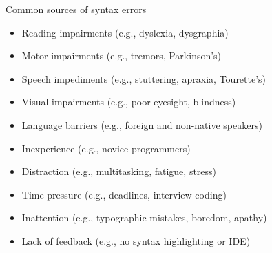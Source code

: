 \documentclass{beamer}
\begin{document}
\begin{frame}[fragile]{Common sources of syntax errors}
  \begin{itemize}
    \item Reading impairments (e.g., dyslexia, dysgraphia)
    \item Motor impairments (e.g., tremors, Parkinson's)
    \item Speech impediments (e.g., stuttering, apraxia, Tourette's)
    \item Visual impairments (e.g., poor eyesight, blindness)
    \item Language barriers (e.g., foreign and non-native speakers)
    \item Inexperience (e.g., novice programmers)
    \item Distraction (e.g., multitasking, fatigue, stress)
    \item Time pressure (e.g., deadlines, interview coding)
    \item Inattention (e.g., typographic mistakes, boredom, apathy)
    \item Lack of feedback (e.g., no syntax highlighting or IDE)
  \end{itemize}
\end{frame}
\end{document}
